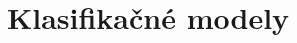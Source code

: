 \documentclass[main.tex]{subfiles}
\begin{document}
	
\section{Klasifikačné modely}	
	
\end{document}

